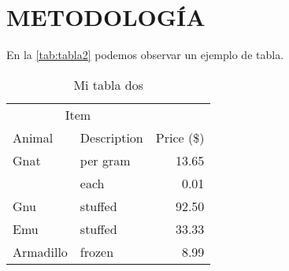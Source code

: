 \chapter{METODOLOGÍA}

\lipsum[1-1] \parencite{latex2e}

En la \autoref{tab:tabla2} podemos observar un ejemplo de tabla.

\begin{table}[H]
	\centering
	\caption{Mi tabla dos}\label{tab:tabla2}
	\begin{tabular}{@{}llr@{}}
		\toprule
		\multicolumn{2}{c}{Item} &                          \\ \cmidrule(r){1-2}
		Animal                   & Description & Price (\$) \\ \midrule
		Gnat                     & per gram    & 13.65      \\
		                         & each        & 0.01       \\
		Gnu                      & stuffed     & 92.50      \\
		Emu                      & stuffed     & 33.33      \\
		Armadillo                & frozen      & 8.99       \\ \bottomrule
	\end{tabular}
\end{table}
